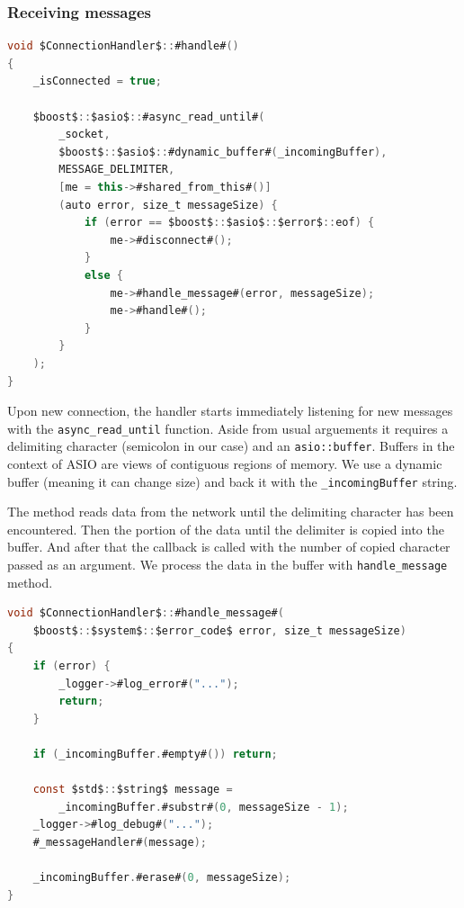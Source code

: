 \subsubsection{Receiving messages}

\begin{lstlisting}[language=csharp, caption={\texttt{handle} method}]
void $ConnectionHandler$::#handle#()
{
    _isConnected = true;

    $boost$::$asio$::#async_read_until#(
        _socket,
        $boost$::$asio$::#dynamic_buffer#(_incomingBuffer),
        MESSAGE_DELIMITER,
        [me = this->#shared_from_this#()]
        (auto error, size_t messageSize) {
            if (error == $boost$::$asio$::$error$::eof) {
                me->#disconnect#();
            }
            else {
                me->#handle_message#(error, messageSize);
                me->#handle#();
            }
        }
    );
}
\end{lstlisting}

Upon new connection, the handler starts immediately listening for new messages with the \texttt{async\_read\_until} function. Aside from usual arguements it requires a delimiting character (semicolon in our case) and an \texttt{asio::buffer}. Buffers in the context of ASIO are views of contiguous regions of memory. We use a dynamic buffer (meaning it can change size) and back it with the \texttt{\_incomingBuffer} string.

The method reads data from the network until the delimiting character has been encountered. Then the portion of the data until the delimiter is copied into the buffer. And after that the callback is called with the number of copied character passed as an argument. We process the data in the buffer with \texttt{handle\_message} method.

\begin{lstlisting}[language=csharp, caption={\texttt{handle\_message} method}]
void $ConnectionHandler$::#handle_message#(
    $boost$::$system$::$error_code$ error, size_t messageSize)
{
    if (error) {
        _logger->#log_error#("...");
        return;
    }

    if (_incomingBuffer.#empty#()) return;

    const $std$::$string$ message = 
        _incomingBuffer.#substr#(0, messageSize - 1);
    _logger->#log_debug#("...");
    #_messageHandler#(message);

    _incomingBuffer.#erase#(0, messageSize);
}
\end{lstlisting}

